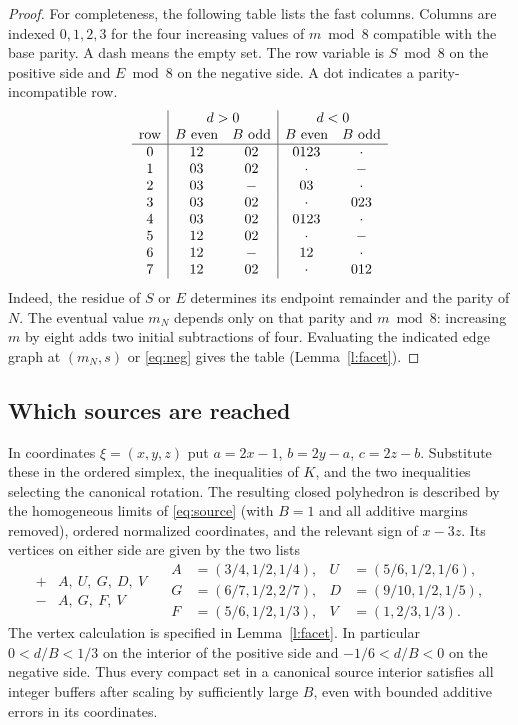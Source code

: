 \documentclass[11pt,reqno]{amsart}
\begin{document}
\begin{proof}
For completeness, the following table lists the fast columns. Columns
are indexed $0,1,2,3$ for the four increasing values of $m\bmod8$
compatible with the base parity. A dash means the empty set. The row
variable is $S\bmod8$ on the positive side and $E\bmod8$ on the
negative side. A dot indicates a parity-incompatible row.
\[
\begin{array}{c|cc|cc}
 &\multicolumn{2}{c|}{d>0}&\multicolumn{2}{c}{d<0}\\
 \text{row}& B\text{ even}&B\text{ odd}&B\text{ even}&B\text{ odd}\\ \hline
 0&12&02&0123&\cdot\\
 1&03&02&\cdot&-\\
 2&03&-&03&\cdot\\
 3&03&02&\cdot&023\\
 4&03&02&0123&\cdot\\
 5&12&02&\cdot&-\\
 6&12&-&12&\cdot\\
 7&12&02&\cdot&012
\end{array}
\]
Indeed, the residue of $S$ or $E$ determines its endpoint remainder
and the parity of $N$. The eventual value $m_N$ depends only on that
parity and $m\bmod8$: increasing $m$ by eight adds two initial
subtractions of four. Evaluating the indicated edge graph at $(m_N,s)$
or \eqref{eq:neg} gives the table (Lemma~\ref{l:facet}).
\end{proof}

\subsection*{Which sources are reached}
In coordinates $\xi=(x,y,z)$ put $a=2x-1$, $b=2y-a$,
$c=2z-b$. Substitute these in the ordered simplex, the inequalities of
$K$, and the two inequalities selecting the canonical rotation.
The resulting closed polyhedron is described by the homogeneous limits
of \eqref{eq:source} (with $B=1$ and all additive margins removed),
ordered normalized coordinates, and the relevant sign of $x-3z$.
Its vertices on either side are given by the two lists
\[
 \begin{array}{c|l}
 + & A,\ U,\ G,\ D,\ V\\
 - & A,\ G,\ F,\ V
 \end{array}
 \quad
 \begin{aligned}
 A&=(3/4,1/2,1/4), & U&=(5/6,1/2,1/6),\\
 G&=(6/7,1/2,2/7), & D&=(9/10,1/2,1/5),\\
 F&=(5/6,1/2,1/3), & V&=(1,2/3,1/3).
 \end{aligned}
\]
The vertex calculation is specified in Lemma~\ref{l:facet}. In particular
$0<d/B<1/3$ on the interior of the positive side and
$-1/6<d/B<0$ on the negative side. Thus every compact set in a
canonical source interior satisfies all integer buffers after scaling by
sufficiently large $B$, even with bounded additive errors in its coordinates.
\end{document}
